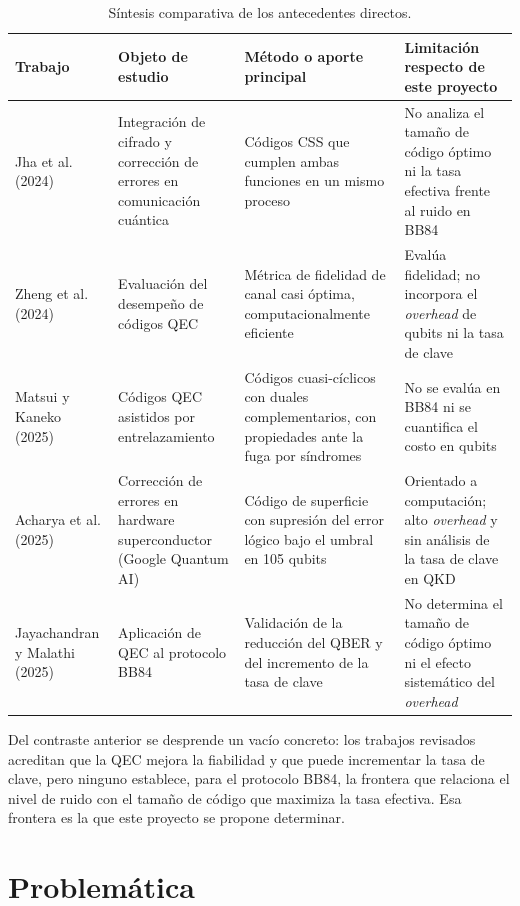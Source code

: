 \documentclass[12pt]{report}
\begin{document}
\begin{table}[H]
\centering
\caption{Síntesis comparativa de los antecedentes directos.}
\label{tab:antecedentes}
\footnotesize
\begin{tabular}{@{}>{\raggedright\arraybackslash}p{2.8cm}>{\raggedright\arraybackslash}p{3.3cm}>{\raggedright\arraybackslash}p{4.1cm}>{\raggedright\arraybackslash}p{4.0cm}@{}}
\toprule
\textbf{Trabajo} & \textbf{Objeto de estudio} & \textbf{Método o aporte principal} & \textbf{Limitación respecto de este proyecto} \\
\midrule
Jha et al. (2024) & Integración de cifrado y corrección de errores en comunicación cuántica & Códigos CSS que cumplen ambas funciones en un mismo proceso & No analiza el tamaño de código óptimo ni la tasa efectiva frente al ruido en BB84 \\
\addlinespace
Zheng et al. (2024) & Evaluación del desempeño de códigos QEC & Métrica de fidelidad de canal casi óptima, computacionalmente eficiente & Evalúa fidelidad; no incorpora el \textit{overhead} de qubits ni la tasa de clave \\
\addlinespace
Matsui y Kaneko (2025) & Códigos QEC asistidos por entrelazamiento & Códigos cuasi-cíclicos con duales complementarios, con propiedades ante la fuga por síndromes & No se evalúa en BB84 ni se cuantifica el costo en qubits \\
\addlinespace
Acharya et al. (2025) & Corrección de errores en hardware superconductor (Google Quantum AI) & Código de superficie con supresión del error lógico bajo el umbral en 105 qubits & Orientado a computación; alto \textit{overhead} y sin análisis de la tasa de clave en QKD \\
\addlinespace
Jayachandran y Malathi (2025) & Aplicación de QEC al protocolo BB84 & Validación de la reducción del QBER y del incremento de la tasa de clave & No determina el tamaño de código óptimo ni el efecto sistemático del \textit{overhead} \\
\bottomrule
\end{tabular}
\end{table}

Del contraste anterior se desprende un vacío concreto: los trabajos revisados
acreditan que la QEC mejora la fiabilidad y que puede incrementar la tasa de
clave, pero ninguno establece, para el protocolo BB84, la frontera que relaciona
el nivel de ruido con el tamaño de código que maximiza la tasa efectiva. Esa
frontera es la que este proyecto se propone determinar.

\section{Problemática}
\end{document}
